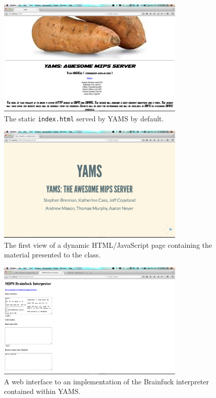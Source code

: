 \documentclass[journal,10pt]{IEEEtran}
\begin{document}
\begin{figure}[H]
\centering
\includegraphics[width=0.8\textwidth,natwidth=1440,natheight=900]{static_document}
\caption{The static \texttt{index.html} served by YAMS by default.}
\label{fig:static_document}
\end{figure}

\begin{figure}[H]
\centering
\includegraphics[width=0.8\textwidth,natwidth=1440,natheight=900]{dynamic_document}
\caption{The first view of a dynamic HTML/JavaScript page containing the material presented to the class.}
\label{fig:dynamic_document}
\end{figure}

\begin{figure}[H]
\centering
\includegraphics[width=0.8\textwidth,natwidth=1440,natheight=900]{interactive_ajax}
\caption{A web interface to an implementation of the Brainfuck interpreter contained within YAMS.}
\label{fig:interactive_ajax}
\end{figure}
\end{document}
